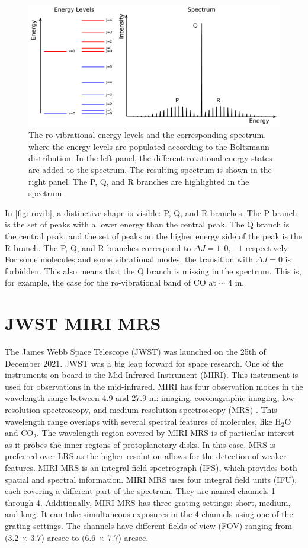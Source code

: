\documentclass[oneside, single, authoryear, semicolon, 12pt]{lion-msc}
\newcommand{\4}{$_4$}
\newcommand{\3}{$_3$}
\newcommand{\2}{$_2$}
\begin{document}
\begin{figure}[H]
    \centering
    \includegraphics[width=0.9\linewidth]{Figures/RoVibSpectrum.pdf}
    \caption{The ro-vibrational energy levels and the corresponding spectrum, where the energy levels are populated according to the Boltzmann distribution. In the left panel, the different rotational energy states are added to the spectrum. The resulting spectrum is shown in the right panel. The P, Q, and R branches are highlighted in the spectrum. }
    \label{fig: rovib}
\end{figure}

In \autoref{fig: rovib}, a distinctive shape is visible: P, Q, and R branches. The P branch is the set of peaks with a lower energy than the central peak. The Q branch is the central peak, and the set of peaks on the higher energy side of the peak is the R branch. The P, Q, and R branches correspond to $\Delta J=1, 0, -1$ respectively. For some molecules and some vibrational modes, the transition with $\Delta J=0$ is forbidden. This also means that the Q branch is missing in the spectrum. This is, for example, the case for the ro-vibrational band of CO at $\sim$ 4 \textmu m.

\section{JWST MIRI MRS}
The James Webb Space Telescope (JWST) was launched on the 25th of December 2021. JWST was a big leap forward for space research. One of the instruments on board is the Mid-Infrared Instrument (MIRI). This instrument is used for observations in the mid-infrared. MIRI has four observation modes in the wavelength range between 4.9 and 27.9 \textmu m:  imaging, coronagraphic imaging, low-resolution spectroscopy, and medium-resolution spectroscopy (MRS) \citep{2023PASP..135d8003W}. This wavelength range overlaps with several spectral features of molecules, like H\2O and CO\2.
The wavelength region covered by MIRI MRS is of particular interest as it probes the inner regions of protoplanetary disks. In this case, MRS is preferred over LRS as the higher resolution allows for the detection of weaker features. MIRI MRS is an integral field spectrograph (IFS), which provides both spatial and spectral information. MIRI MRS uses four integral field units (IFU), each covering a different part of the spectrum. They are named channels 1 through 4. Additionally, MIRI MRS has three grating settings: short, medium, and long. It can take simultaneous exposures in the 4 channels using one of the grating settings. The channels have different fields of view (FOV) ranging from (3.2 $\times$ 3.7) arcsec to (6.6 $\times$ 7.7) arcsec. 
\end{document}
